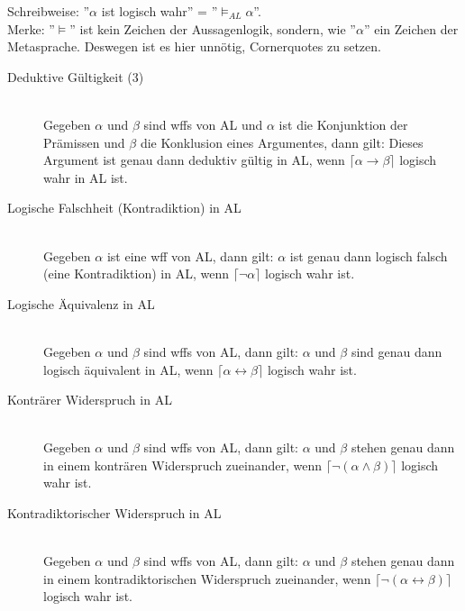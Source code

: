 \documentclass{scrartcl}
\begin{document}
Schreibweise: ''$ \alpha $ ist logisch wahr'' = ''$ \models_{AL} \alpha $''. \\

Merke: ''$ \models $'' ist kein Zeichen der Aussagenlogik, sondern, wie ''$ \alpha $'' ein Zeichen der Metasprache. Deswegen ist es hier unnötig, Cornerquotes zu setzen.

\begin{description}
	\item[Deduktive Gültigkeit (3)] \mbox{}\\ Gegeben $ \alpha $ und $ \beta $ sind wffs von AL und $ \alpha $ ist die Konjunktion der Prämissen und $ \beta $ die Konklusion eines Argumentes, dann gilt: Dieses Argument ist genau dann deduktiv gültig in AL, wenn $ \lceil \alpha \rightarrow \beta \rceil $ logisch wahr in AL ist.
\end{description}

\begin{description}
	\item[Logische Falschheit (Kontradiktion) in AL] \mbox{}\\ Gegeben $ \alpha $ ist eine wff von AL, dann gilt: $ \alpha $ ist genau dann logisch falsch (eine Kontradiktion) in AL, wenn $ \lceil \neg \alpha \rceil $ logisch wahr ist.
\end{description}

\begin{description}
	\item[Logische Äquivalenz in AL] \mbox{}\\ Gegeben $ \alpha $ und $ \beta $ sind wffs von AL, dann gilt: $ \alpha $ und $ \beta $ sind genau dann logisch äquivalent in AL, wenn $ \lceil \alpha \leftrightarrow \beta \rceil $ logisch wahr ist.
\end{description}

\begin{description}
	\item[Konträrer Widerspruch in AL] \mbox{}\\ Gegeben $ \alpha $ und $ \beta $ sind wffs von AL, dann gilt: $ \alpha $ und $ \beta $ stehen genau dann in einem konträren Widerspruch zueinander, wenn $ \lceil \neg (\alpha \wedge \beta) \rceil $ logisch wahr ist.
\end{description}

\begin{description}
	\item[Kontradiktorischer Widerspruch in AL] \mbox{}\\ Gegeben $ \alpha $ und $ \beta $ sind wffs von AL, dann gilt: $ \alpha $ und $ \beta $ stehen genau dann in einem kontradiktorischen Widerspruch zueinander, wenn $ \lceil \neg (\alpha \leftrightarrow \beta) \rceil $ logisch wahr ist.
\end{description}
\end{document}
